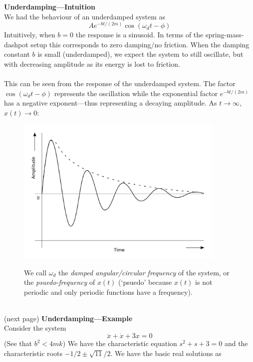 \documentclass{report}
\begin{document}
\newpage
\noindent\textbf{Underdamping---Intuition}\\
We had the behaviour of an underdamped system as
\begin{equation*}
Ae^{-bt/(2m)}\cos(\omega_dt-\phi)
\end{equation*}
Intuitively, when $b=0$ the response is a sinusoid. In terms of the spring-mass-dashpot setup this corresponds to 
zero damping/no friction. When the damping constant $b$ is small (underdamped), we expect the system to still
oscillate, but with decreasing amplitude as its energy is lost to friction.\\
\vspace{1mm}\\
This can be seen from the response of the underdamped system. The factor $\cos(\omega_dt-\phi)$ represents
the oscillation while the exponential factor $e^{-bt/(2m)}$ has a negative exponent---thus representing 
a decaying amplitude. As $t\to\infty$, $x(t)\to0$:
\begin{figure}[h]
\begin{center}
\includegraphics[width=10cm]{25}\\
\end{center}
We call $\omega_d$ the \textit{damped angular/circular frequency} of the system, or the \textit{psuedo-frequency}
of $x(t)$ (`psuedo' because $x(t)$ is not periodic and only periodic functions have a frequency).
\end{figure}\\
(next page)
\newpage
\noindent\textbf{Underdamping---Example}\\
Consider the system
\begin{equation*}
\ddot{x}+\dot{x}+3x=0
\end{equation*}
(See that $b^2<4mk$) We have the characteristic equation 
$s^2+s+3=0$ and the characteristic roots $-1/2\pm\sqrt{11}/2$. We have the basic real solutions as
\end{document}
